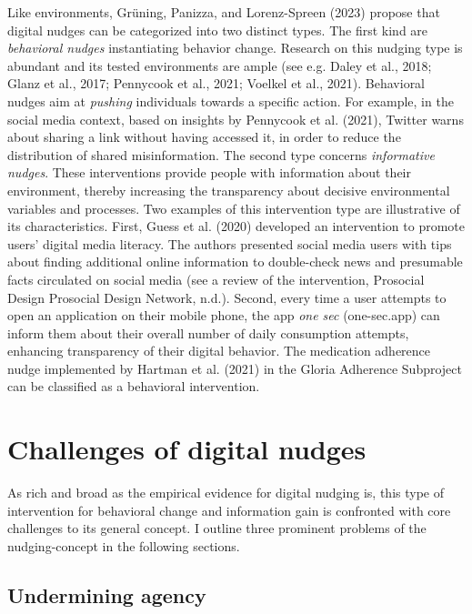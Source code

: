 \documentclass[reflection, authordate]{jote-new-article}
\begin{document}
Like environments, Grüning, Panizza, and
Lorenz-Spreen (2023) propose that digital nudges can be categorized into two distinct types. The first kind are \emph{behavioral nudges} instantiating behavior change. Research on this nudging type is abundant and its tested environments are ample (see e.g. Daley et al., 2018; Glanz et al., 2017; Pennycook et al., 2021; Voelkel et al., 2021). Behavioral nudges aim at \emph{pushing }individuals towards a specific action. For example, in the social media context, based on insights by Pennycook et al. (2021), Twitter warns about sharing a link without having accessed it, in order to reduce the distribution of shared misinformation. The second type concerns \emph{informative nudges}. These interventions provide people with information about their environment, thereby increasing the transparency about decisive environmental variables and processes. Two examples of this intervention type are illustrative of its characteristics. First, Guess et al. (2020)  developed an intervention to promote users’ digital media literacy. The authors presented social media users with tips about finding additional online information to double-check news and presumable facts circulated on social media (see a review of the intervention, Prosocial Design Prosocial Design Network, n.d.). Second, every time a user attempts to open an application on their mobile phone, the app \emph{one sec }(one-sec.app) can inform them about their overall number of daily consumption attempts, enhancing transparency of their digital behavior. The medication adherence nudge implemented by Hartman et al. (2021) in the Gloria Adherence Subproject can be classified as a behavioral intervention.



\section{Challenges of digital nudges}



As rich and broad as the empirical evidence for digital nudging is, this type of intervention for behavioral change and information gain is confronted with core challenges to its general concept. I outline three prominent problems of the nudging-concept in the following sections.



\subsection{Undermining agency}
\end{document}
